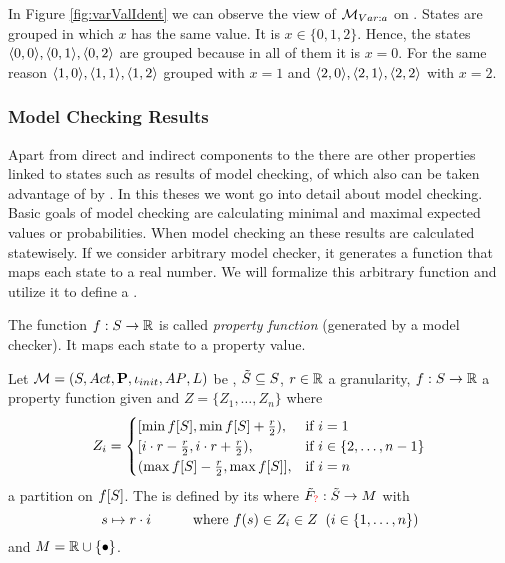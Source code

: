 \documentclass[preview]{standalone}
\begin{document}
In Figure \ref{fig:varValIdent} we can observe the view of ${{{{{\mathcal{M}}}}_{{Var:{a}}}}}$ on \chgph. States are grouped in which $x$ has the same value. It is $x \in \{0, 1, 2\}$. Hence, the states ${\langle0,0\rangle}, {\langle0,1\rangle},{\langle0,2\rangle}$ are grouped because in all of them it is $x=0$. For the same reason ${\langle1,0\rangle}, {\langle1,1\rangle},{\langle1,2\rangle}$ grouped with $x=1$ and ${\langle2,0\rangle}, {\langle2,1\rangle},{\langle2,2\rangle}$ with $x=2$.
\subsubsection{Model Checking Results}
Apart from direct and indirect components to the \mdpN there are other properties linked to states such as results of model checking, of which also can be taken advantage of by \viewsN. In this theses we wont go into detail about model checking. Basic goals of model checking are calculating minimal and maximal expected values or probabilities. When model checking an \chgph these results are calculated statewisely. If we consider arbitrary model checker, it generates a function that maps each state to a real number. We will formalize this arbitrary function and utilize it to define a \viewN.

\begin{definition}
	The function ${f} : {S} \to {\mathbb{R}}$ is called \emph{property function} (generated by a model checker). It maps each state to a property value.
\end{definition}

\begin{definition}
	Let ${{{\mathcal{M}}}} = {{({S}, {Act}, {\textbf{P}}, {\iota_{init}}, {AP}, {L})}}$ be \achgphN, ${\tilde{{S}}} \subseteq {S}$, $r \in {\mathbb{R}}$ a granularity, ${f} : {S} \to {\mathbb{R}}$ a property function given and $Z = \{Z_1, \dots, Z_n\}$ where 
	\[
		Z_i = 
		\begin{cases}
			[\min\propfct[\states], \min\propfct[\states] + \frac{r}{2}), &\text{if } i=1 \\
			[i \cdot r -  \frac{r}{2}, i \cdot r +  \frac{r}{2}), &\text{if } i\in\{2,\dots, n-1\} \\
			(\max\propfct[\states]-\frac{r}{2}, \max\propfct[\states]], &\text{if } i = n
		\end{cases}
	\]
	a partition on ${f}[{S}]$. The \viewN \viewprop is defined by its \grpfctN \gfctprop where ${{\tilde{F}_{{{\color{red}?}}}}} : {\tilde{{S}}} \to {\ensuremath{{M}}}$ with
	\[
	{s} \mapsto r \cdot i \quad\quad\quad \text{where } {f}({s}) \in Z_i \in Z \;\; (i \in \{1, \dots, n\}) 
	\]
	and $\imggrp = \realnums \cup \remset$.
\end{definition}
\end{document}
